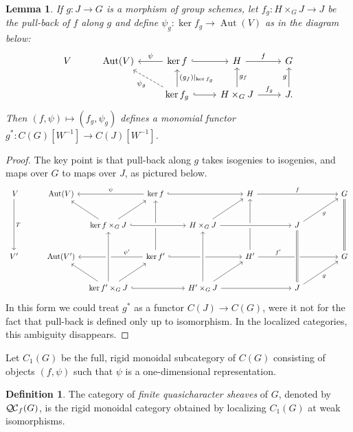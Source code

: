 \documentclass[11pt]{amsart}
\theoremstyle{plain}
\newtheorem{lemma}[theorem]{Lemma}
\theoremstyle{definition}
\newtheorem{definition}[theorem]{Definition}
\theoremstyle{remark}
\DeclareMathOperator{\Aut}{Aut}
\newcommand{\QC}{{\mathcal{Q\hskip-0.8pt C}}}
\newcommand{\QCf}{{\QC_f}}
\begin{document}
\begin{lemma}\label{lemma:finite-pull-back}
If $g : J \to G$ is a morphism of group schemes, let $f_g : H\times_G J\to J$
be the pull-back of $f$ along $g$ and define $\psi_g : \ker f_g \to \Aut(V)$ as in the diagram below:
\[
\begin{tikzcd}
V & \Aut(V) & \arrow[swap]{l}{\psi} \ker f \arrow[hook]{r} & H \arrow{r}{f} &  G\\
  &  & \arrow[dashed]{ul}{\psi_g} \arrow[swap]{u}{(g_f)\vert_{\ker f_g}} \ker f_g \arrow[hook]{r}
  & \arrow[swap]{u}{g_f} H\times_G J \arrow{r}{f_g} & \arrow{u}{g} J.
\end{tikzcd}
\]
Then $(f,\psi) \mapsto (f_g,\psi_g)$
defines a monomial functor $g^* : C(G)[W^{-1}] \to C(J)[W^{-1}]$.
\end{lemma}

\begin{proof}
The key point is that pull-back along $g$ takes isogenies to isogenies,
and maps over $G$ to maps over $J$, as pictured below.
\[
\begin{tikzcd}[row sep={{{{40,between origins}}}},column sep={{{{60,between origins}}}}]
\ V \arrow{dd}{T} & \Aut(V) && \arrow[swap]{ll}{\psi} \ker f \arrow[hook]{rr} \arrow[leftarrow]{dd} && H \arrow{rr}{f} \arrow[leftarrow]{dd} && \arrow[equal]{dd} G\\
 & & \arrow{ul} \ker f\times_G J \arrow{ur} \arrow[hook, crossing over]{rr} && H\times_G J \arrow{ur} \arrow[crossing over]{rr} && J \arrow[swap]{ur}{g} & \\
V' & \Aut(V') && \arrow[swap,pos=0.25]{ll}{\psi'} \ker f'  \arrow[hook]{rr}
&& H' \arrow[pos=0.25]{rr}{f'} && G\\
 & & \arrow{ul} \ker f'\times_G J \arrow[crossing over]{uu} \arrow{ur} \arrow[hook]{rr}
 && \arrow[crossing over]{uu} H'\times_G J \arrow{ur} \arrow{rr} && \arrow[equals, crossing over]{uu} J \arrow[swap]{ur}{g} & 
\end{tikzcd}
\]
In this form we could treat $g^*$ as a functor $C(J)\to C(G)$,
were it not for the fact that pull-back is defined only up to isomorphism.
In the localized categories, this ambiguity disappears. 
\end{proof}

Let $C_1(G)$ be the full, rigid monoidal subcategory of $C(G)$ consisting of objects
$(f,\psi)$ such that $\psi$ is a one-dimensional representation.

\begin{definition}
The category of \emph{finite quasicharacter sheaves} of $G$, denoted by $\QCf(G)$,
is the rigid monoidal category obtained by localizing $C_1(G)$ at weak isomorphisms.
\end{definition}
\end{document}
